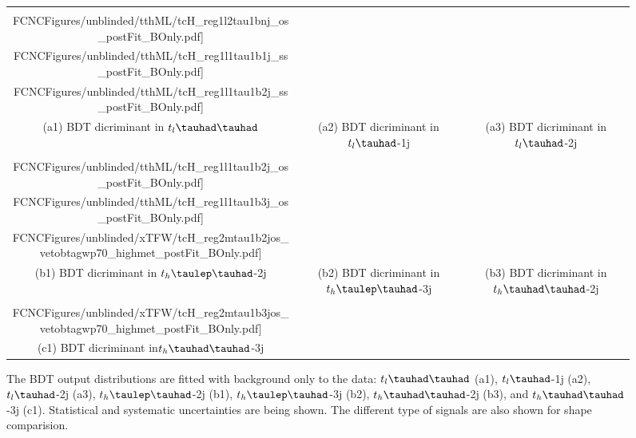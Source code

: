 \begin{figure}[H]
\centering
\begin{tabular}{@{}ccc@{}}
\texttt{[image: \\FCNCFigures/unblinded/tthML/tcH\_reg1l2tau1bnj\_os\_postFit\_BOnly.pdf]}&
\texttt{[image: \\FCNCFigures/unblinded/tthML/tcH\_reg1l1tau1b1j\_ss\_postFit\_BOnly.pdf]}&
\texttt{[image: \\FCNCFigures/unblinded/tthML/tcH\_reg1l1tau1b2j\_ss\_postFit\_BOnly.pdf]}\\
(a1) BDT dicriminant in $t_l\thadhad$ & (a2) BDT dicriminant in  $t_l\tauhad$-1j& (a3) BDT dicriminant in $t_l\tauhad$-2j\\
\texttt{[image: \\FCNCFigures/unblinded/tthML/tcH\_reg1l1tau1b2j\_os\_postFit\_BOnly.pdf]}&
\texttt{[image: \\FCNCFigures/unblinded/tthML/tcH\_reg1l1tau1b3j\_os\_postFit\_BOnly.pdf]}&
\texttt{[image: \\FCNCFigures/unblinded/xTFW/tcH\_reg2mtau1b2jos\_vetobtagwp70\_highmet\_postFit\_BOnly.pdf]}\\
(b1) BDT dicriminant in $t_h\tlhad$-2j & (b2) BDT dicriminant in  $t_h\tlhad$-3j & (b3) BDT dicriminant in $t_h\thadhad$-2j \\
\texttt{[image: \\FCNCFigures/unblinded/xTFW/tcH\_reg2mtau1b3jos\_vetobtagwp70\_highmet\_postFit\_BOnly.pdf]}& \\
(c1) BDT dicriminant in$t_h\thadhad$-3j\\
\end{tabular}
\caption{ The BDT output distributions are fitted with background only to the data: $t_l\thadhad$ (a1),  $t_l\tauhad$-1j (a2),  $t_l\tauhad$-2j (a3),
  $t_h\tlhad$-2j (b1), $t_h\tlhad$-3j (b2), $t_h\thadhad$-2j (b3), and $t_h\thadhad$-3j (c1).
  Statistical and systematic uncertainties are being shown. The different type of signals are also shown for shape comparision.}
\label{fig:Bonlyfit_data}
\end{figure}


